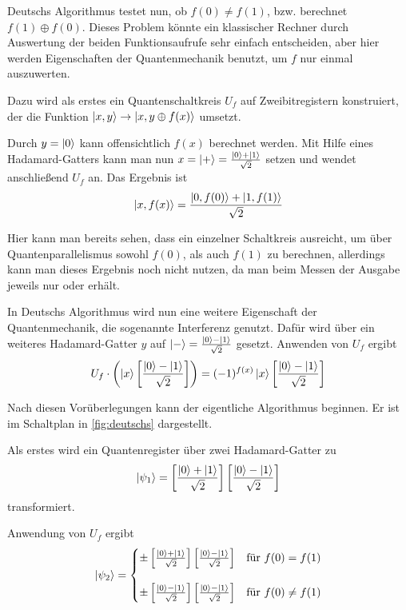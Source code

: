 \documentclass{acm_proc_article-sp}
\begin{document}
Deutschs Algorithmus testet nun, ob $f(0) \neq f(1)$, bzw. berechnet $f(1) \oplus f(0)$. Dieses Problem könnte ein klassischer
Rechner durch Auswertung der beiden Funktionsaufrufe sehr einfach entscheiden, aber hier werden Eigenschaften
der Quantenmechanik benutzt, um $f$ nur einmal auszuwerten.

Dazu wird als erstes ein Quantenschaltkreis $U_f$ auf Zweibitregistern konstruiert, der die Funktion 
$\left|x,y\right\rangle \rightarrow \left|x, y \oplus f(x)\right\rangle$ umsetzt. 

Durch $y = \left|0\right\rangle$ kann offensichtlich $f(x)$ berechnet werden. Mit Hilfe eines Hadamard-Gatters kann man nun 
$x = \left|+\right\rangle = \frac{\left|0\right\rangle + \left|1\right\rangle}{\sqrt 2}$ setzen
und wendet anschließend $U_f$ an. Das Ergebnis ist
\[
    \left|x, f(x)\right\rangle = \frac{\left|0, f(0)\right\rangle + \left|1, f(1)\right\rangle}{\sqrt 2}
\]

Hier kann man bereits sehen, dass ein einzelner Schaltkreis ausreicht, um über Quantenparallelismus sowohl $f(0)$, als auch $f(1)$ 
zu berechnen, allerdings kann man dieses Ergebnis noch nicht nutzen, da man beim Messen der Ausgabe jeweils nur  oder
 erhält.

In Deutschs Algorithmus wird nun eine weitere Eigenschaft der Quantenmechanik, die
sogenannte Interferenz genutzt. Dafür wird über ein weiteres Hadamard-Gatter $y$ auf \linebreak 
$\left|-\right\rangle = \frac{\left|0\right\rangle - \left|1\right\rangle}{\sqrt 2}$
gesetzt. Anwenden von $U_f$ ergibt
\begin{equation}
    U_f \cdot \left( \left|x\right\rangle \left[\frac{\left|0\right\rangle - \left|1\right\rangle}{\sqrt 2}\right] \right) = (-1)^{f(x)} \left|x\right\rangle \left[\frac{\left|0\right\rangle - \left|1\right\rangle}{\sqrt 2}\right] 
\end{equation}

Nach diesen Vorüberlegungen kann der eigentliche Algorithmus beginnen. Er ist im Schaltplan
in \autoref{fig:deutschs} dargestellt.

Als erstes wird ein Quantenregister  über zwei Hadamard-Gatter zu 
\begin{equation}
\left|\psi_1\right\rangle = \left[\frac{\left|0\right\rangle + \left|1\right\rangle}{\sqrt 2}\right]\left[\frac{\left|0\right\rangle - \left|1\right\rangle}{\sqrt 2}\right] 
\end{equation}
transformiert.

Anwendung von $U_f$ ergibt 
\begin{equation}
    \left|\psi_2\right\rangle = \begin{cases}
        \pm \left[\frac{\left|0\right\rangle + \left|1\right\rangle}{\sqrt 2}\right] \left[\frac{\left|0\right\rangle - \left|1\right\rangle}{\sqrt 2}\right] & \text{für } f(0) = f(1) \\[1.5em]
        \pm \left[\frac{\left|0\right\rangle - \left|1\right\rangle}{\sqrt 2}\right] \left[\frac{\left|0\right\rangle - \left|1\right\rangle}{\sqrt 2}\right] & \text{für } f(0) \neq f(1)
        \end{cases}
\end{equation}
\end{document}
